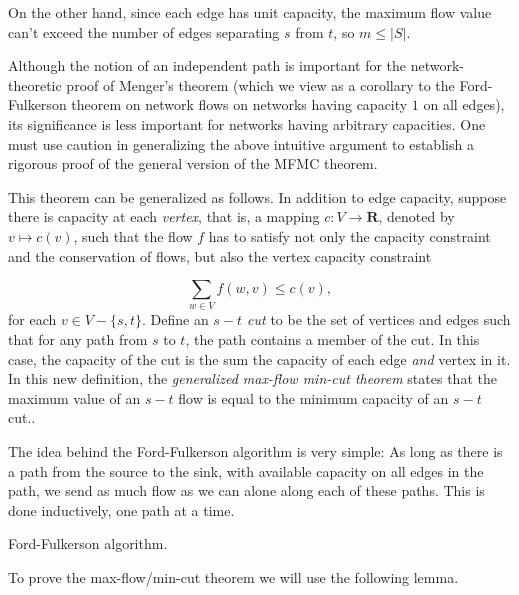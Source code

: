 On the other hand, since each edge has unit capacity,
the maximum flow value can't exceed the number of
edges separating $s$ from $t$, so $m\leq |S|$.


\begin{remark}
Although the notion of an independent path is important
for the network-theoretic proof of Menger's theorem
(which we view as a corollary to the Ford-Fulkerson
theorem on network flows on networks having
capacity $1$ on all edges), its significance is less
important for networks having arbitrary capacities.
One must use caution in generalizing the above
intuitive argument to establish a rigorous proof
of the general version of the MFMC theorem.
\end{remark}

\begin{remark}
\label{remark:GMCMF}
{\rm
This theorem can be generalized as follows.
In addition to edge capacity, suppose there is capacity at each {\it vertex},
that is, a mapping $c: V \to {\mathbf{R}}$, denoted by
$v \mapsto c(v)$, such that the flow $f$ has to
satisfy not only the capacity constraint and the conservation of flows,
but also the vertex capacity constraint

\[
 \sum_{w\in V} f(w,v) \leq c(v),
\]
for each $v \in V-\{s,t\}$.
Define an {\it $s-t$ cut} to be the set of vertices and edges such
that for any path from $s$ to $t$, the path contains a member of the cut.
In this case, the capacity of the cut is the sum the capacity of each
edge {\it and} vertex in it.
In this new definition, the {\it generalized max-flow min-cut theorem}
states that the maximum value of an $s-t$ flow is equal to the minimum
capacity of an $s-t$ cut..
}
\end{remark}

The idea behind the Ford-Fulkerson algorithm is very simple: As long as
there is a path from the source to the sink, with
available capacity on all edges in the
path, we send as much flow as we can alone along each
of these paths. This is done inductively, one path at a time.

\begin{algorithm}[!htbp]

\caption{Ford-Fulkerson algorithm.}
\label{alg:distance-connectivity:ford-fulkerson}
\end{algorithm}

To prove the max-flow/min-cut theorem we will use the following lemma.

